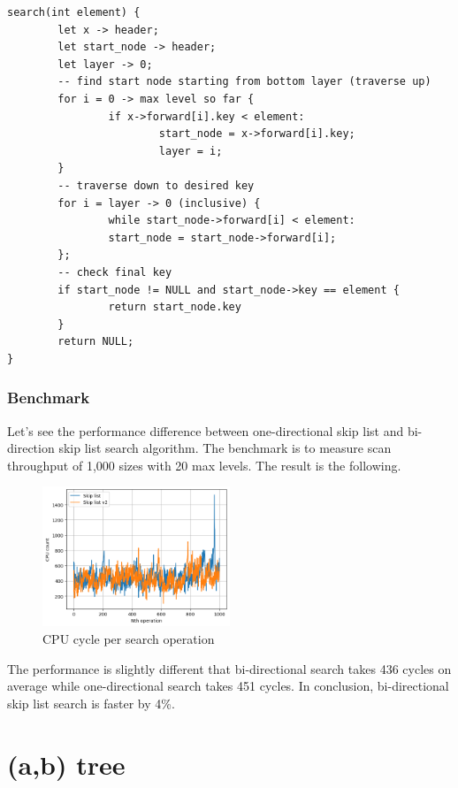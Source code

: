\documentclass[a4paper, 12pt]{report}
\begin{document}
\begin{verbatim}
search(int element) {
        let x -> header;
        let start_node -> header;
        let layer -> 0;
        -- find start node starting from bottom layer (traverse up)
        for i = 0 -> max level so far {
                if x->forward[i].key < element:
                        start_node = x->forward[i].key;
                        layer = i;
        }
        -- traverse down to desired key
        for i = layer -> 0 (inclusive) {
                while start_node->forward[i] < element:
                start_node = start_node->forward[i];
        };
        -- check final key
        if start_node != NULL and start_node->key == element {
                return start_node.key
        }
        return NULL;
}
\end{verbatim}

\subsection{Benchmark}

Let's see the performance difference between one-directional skip list and bi-direction skip list search algorithm.
The benchmark is to measure scan throughput of 1,000 sizes with 20 max levels. The result is the following.

\begin{figure}[h]
        \centering
        \includegraphics[width=0.5\textwidth,scale=0.5]{skip_list_v2_scan.png}
        \caption{\label{fig:skip_list_v2_scan} CPU cycle per search operation}
\end{figure}

The performance is slightly different that bi-directional search takes 436 cycles on average while one-directional search takes
451 cycles. In conclusion, bi-directional skip list search is faster by 4\%.



\chapter{(a,b) tree}
\end{document}
